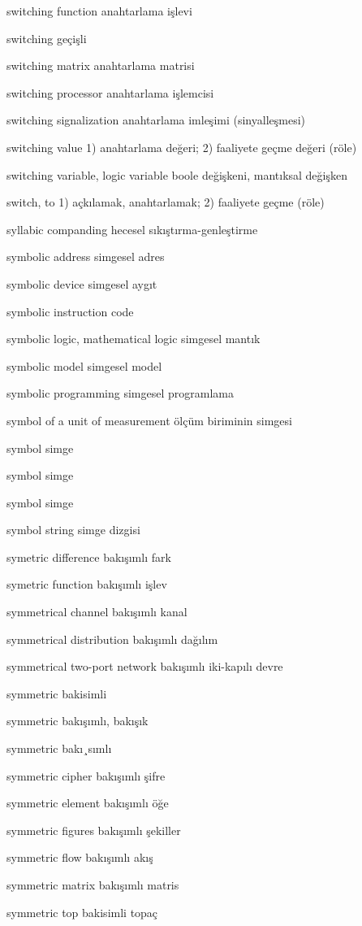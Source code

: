 \documentclass[12pt,fleqn]{article}\usepackage{../../common}
\begin{document}
switching function anahtarlama işlevi

switching geçişli

switching matrix anahtarlama matrisi

switching processor anahtarlama işlemcisi

switching signalization anahtarlama imleşimi (sinyalleşmesi)

switching value 1) anahtarlama değeri; 2) faaliyete geçme değeri (röle)

switching variable, logic variable boole değişkeni, mantıksal değişken

switch, to 1) açkılamak, anahtarlamak; 2) faaliyete geçme (röle)

syllabic companding hecesel sıkıştırma-genleştirme

symbolic address simgesel adres

symbolic device simgesel aygıt

symbolic instruction code

symbolic logic, mathematical logic simgesel mantık

symbolic model simgesel model

symbolic programming simgesel programlama

symbol of a unit of measurement ölçüm biriminin simgesi

symbol simge

symbol simge

symbol simge

symbol string simge dizgisi

symetric difference bakışımlı fark

symetric function bakışımlı işlev

symmetrical channel bakışımlı kanal

symmetrical distribution bakışımlı dağılım

symmetrical two-port network bakışımlı iki-kapılı devre

symmetric bakisimli

symmetric bakışımlı, bakışık

symmetric bakı¸sımlı

symmetric cipher bakışımlı şifre

symmetric element bakışımlı öğe

symmetric figures bakışımlı şekiller

symmetric flow bakışımlı akış

symmetric matrix bakışımlı matris

symmetric top bakisimli topaç
\end{document}
